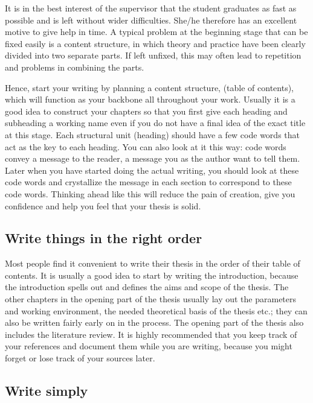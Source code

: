 It is in the best interest of the supervisor that the student graduates as fast as possible and is left without wider difficulties. She/he therefore has an excellent motive to give help in time. A typical problem at the beginning stage that can be fixed easily is a content structure, in which theory and practice have been clearly divided into two separate parts. If left unfixed, this may often lead to repetition and problems in combining the parts.

Hence, start your writing by planning a content structure, (table of contents), which will function as your backbone all throughout your work. Usually it is a good idea to construct your chapters so that you first give each heading and subheading a working name even if you do not have a final idea of the exact title at this stage. Each structural unit (heading) should have a few code words that act as the key to each heading. You can also look at it this way: code words convey a message to the reader, a message you as the author want to tell them. Later when you have started doing the actual writing, you should look at these code words and crystallize the message in each section to correspond to these code words. Thinking ahead like this will reduce the pain of creation, give you confidence and help you feel that your thesis is solid.

\subsection{Write things in the right order}

Most people find it convenient to write their thesis in the order of their table of contents. It is usually a good idea to start by writing the introduction, because the introduction spells out and defines the aims and scope of the thesis. The other chapters in the opening part of the thesis usually lay out the parameters and working environment, the needed theoretical basis of the thesis etc.; they can also be written fairly early on in the process. The opening part of the thesis also includes the literature review. It is highly recommended that you keep track of your references and document them while you are writing, because you might forget or lose track of your sources later.

\subsection{Write simply}

